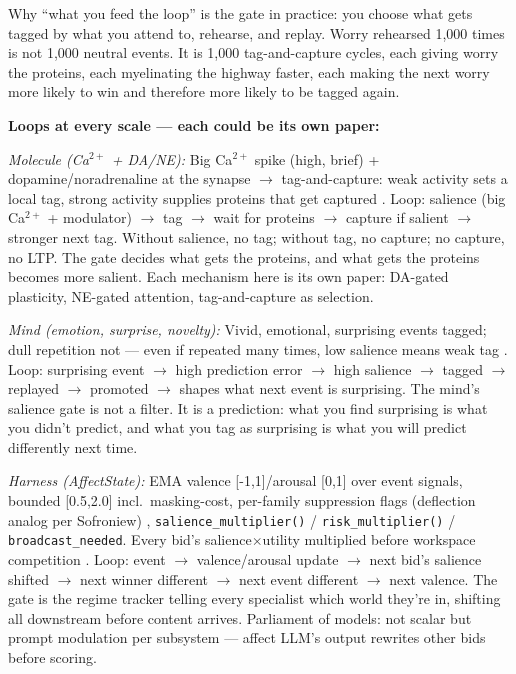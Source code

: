 \documentclass[11pt]{article}
\begin{document}
Why ``what you feed the loop'' is the gate in practice: you choose what gets tagged by what you attend to, rehearse, and replay. Worry rehearsed 1,000 times is not 1,000 neutral events. It is 1,000 tag-and-capture cycles, each giving worry the proteins, each myelinating the highway faster, each making the next worry more likely to win and therefore more likely to be tagged again.

\textbf{Loops at every scale --- each could be its own paper:}

\textit{Molecule (Ca$^{2+}$ + DA/NE):} Big Ca$^{2+}$ spike (high, brief) + dopamine/noradrenaline at the synapse $\to$ tag-and-capture: weak activity sets a local tag, strong activity supplies proteins that get captured \citep{tononi2014}. Loop: salience (big Ca$^{2+}$ + modulator) $\to$ tag $\to$ wait for proteins $\to$ capture if salient $\to$ stronger next tag. Without salience, no tag; without tag, no capture; no capture, no LTP. The gate decides what gets the proteins, and what gets the proteins becomes more salient. Each mechanism here is its own paper: DA-gated plasticity, NE-gated attention, tag-and-capture as selection.

\textit{Mind (emotion, surprise, novelty):} Vivid, emotional, surprising events tagged; dull repetition not --- even if repeated many times, low salience means weak tag \citep{seth2021,sofroniew2026}. Loop: surprising event $\to$ high prediction error $\to$ high salience $\to$ tagged $\to$ replayed $\to$ promoted $\to$ shapes what next event is surprising. The mind's salience gate is not a filter. It is a prediction: what you find surprising is what you didn't predict, and what you tag as surprising is what you will predict differently next time.

\textit{Harness (AffectState):} EMA valence [-1,1]/arousal [0,1] over event signals, bounded [0.5,2.0] incl.\ masking-cost, per-family suppression flags (deflection analog per Sofroniew) \citep{sofroniew2026}, \texttt{salience\_multiplier()} / \texttt{risk\_multiplier()} / \texttt{broadcast\_needed}. Every bid's salience$\times$utility multiplied before workspace competition \citep{nayebi2026}. Loop: event $\to$ valence/arousal update $\to$ next bid's salience shifted $\to$ next winner different $\to$ next event different $\to$ next valence. The gate is the regime tracker telling every specialist which world they're in, shifting all downstream before content arrives. Parliament of models: not scalar but prompt modulation per subsystem --- affect LLM's output rewrites other bids before scoring.
\end{document}
